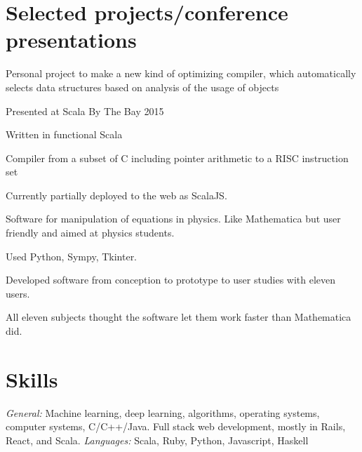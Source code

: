 \documentclass[letterpaper]{resume}
\begin{document}
\section{Selected projects/conference presentations}

\begin{compactitem}
\item Personal project to make a new kind of optimizing compiler, which automatically selects data structures based on analysis of the usage of objects
\item Presented at Scala By The Bay 2015
\item Written in functional Scala
\end{compactitem}

\begin{compactitem}
\item Compiler from a subset of C including pointer arithmetic to a RISC instruction set
\item Currently partially deployed to the web as ScalaJS.
\end{compactitem}

\begin{compactitem}
\item Software for manipulation of equations in physics. Like Mathematica but user friendly and aimed at physics students.
\item Used Python, Sympy, Tkinter.
\item Developed software from conception to prototype to user studies with eleven users.
\item All eleven subjects thought the software let them work faster than Mathematica did.
\end{compactitem}


\section{Skills}
\textit{General:} Machine learning, deep learning, algorithms, operating systems, computer systems, C/C++/Java. Full stack web development, mostly in Rails, React, and Scala.
\textit{Languages:} Scala, Ruby, Python, Javascript, Haskell\\
\end{document}
